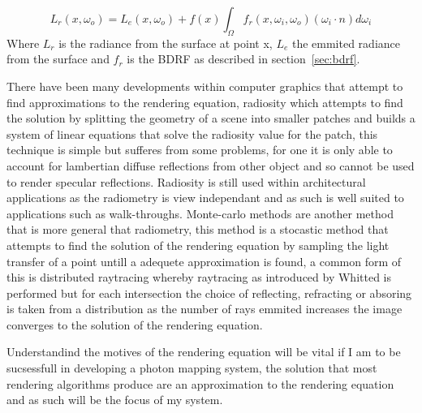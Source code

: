 \begin{equation}
L_{r}(x, \omega_{o}) = L_{e}(x, \omega_{o})
					 + f(x)
					   \int_{\Omega}
					 		f_{r}(x, \omega_{i}, \omega_{o})
							(\omega_{i} \cdot n)d\omega_{i}
\end{equation}
Where $L_{r}$ is the radiance from the surface at point x, $L_{e}$ the emmited radiance from the
surface and $f_{r}$ is the BDRF as described in section~\ref{sec:bdrf}.

There have been many developments within computer graphics that attempt to find approximations
to the rendering equation, radiosity \cite{Goral85}which attempts to find the solution by splitting 
the geometry of a scene into smaller patches and builds a system of linear equations that solve the 
radiosity value for the patch, this technique is simple but sufferes from some problems, for one it 
is only able to account for lambertian diffuse reflections from other object and so cannot be used
to render specular reflections. Radiosity is still used within architectural applications as the
radiometry is view independant and as such is well suited to applications such as walk-throughs.
Monte-carlo methods are another method that is more general that radiometry, this method is a
stocastic method that attempts to find the solution of the rendering equation by sampling the light
transfer of a point untill a adequete approximation is found, a common form of this is distributed
raytracing whereby raytracing as introduced by Whitted \cite{whitted79a} is performed but for each
intersection the choice of reflecting, refracting or absoring is taken from a distribution as the
number of rays emmited increases the image converges to the solution of the rendering equation.

Understandind the motives of the rendering equation will be vital if I am to be sucsessfull in
developing a photon mapping system, the solution that most rendering algorithms produce are an
approximation to the rendering equation and as such will be the focus of my system.
